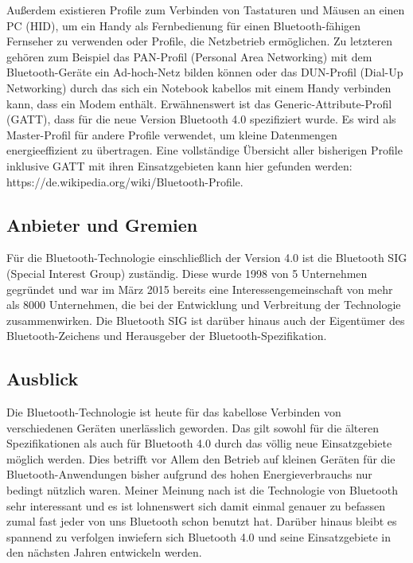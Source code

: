 \begin{multicols}{3}
Außerdem existieren Profile zum Verbinden von Tastaturen und Mäusen an einen PC (HID), um ein Handy als Fernbedienung für einen Bluetooth-fähigen Fernseher zu verwenden oder Profile, die Netzbetrieb ermöglichen. Zu letzteren gehören zum Beispiel das PAN-Profil (Personal Area Networking) mit dem Bluetooth-Geräte ein Ad-hoch-Netz bilden können oder das DUN-Profil (Dial-Up Networking) durch das sich ein Notebook kabellos mit einem Handy verbinden kann, dass ein Modem enthält. Erwähnenswert ist das Generic-Attribute-Profil (GATT), dass für die neue Version Bluetooth 4.0 spezifiziert wurde. Es wird als Master-Profil für andere Profile verwendet, um kleine Datenmengen energieeffizient zu übertragen. \cite{Bluetooth_4.2} Eine vollständige Übersicht aller bisherigen Profile inklusive GATT mit ihren Einsatzgebieten kann hier gefunden werden: https://de.wikipedia.org/wiki/Bluetooth-Profile.

\subsection*{Anbieter und Gremien}
Für die Bluetooth-Technologie einschließlich der Version 4.0 ist die Bluetooth SIG (Special Interest Group) zuständig. Diese wurde 1998 von 5 Unternehmen gegründet und war im März 2015 bereits eine Interessengemeinschaft von mehr als 8000 Unternehmen, die bei der Entwicklung und Verbreitung der Technologie zusammenwirken. Die Bluetooth SIG ist darüber hinaus auch der Eigentümer des Bluetooth-Zeichens und Herausgeber der Bluetooth-Spezifikation.\cite{Bluetooth_4.4}

\subsection*{Ausblick}
Die Bluetooth-Technologie ist heute für das kabellose 
Verbinden von verschiedenen Geräten unerlässlich geworden. 
Das gilt sowohl für die älteren Spezifikationen als auch für 
Bluetooth 4.0 durch das völlig neue Einsatzgebiete möglich werden. 
Dies betrifft vor Allem den Betrieb auf kleinen Geräten für die 
Bluetooth-Anwendungen bisher aufgrund des hohen Energieverbrauchs
nur bedingt nützlich waren. Meiner Meinung nach ist die Technologie
von Bluetooth sehr interessant und es ist lohnenswert sich damit einmal
genauer zu befassen zumal fast jeder von uns Bluetooth schon benutzt hat. 
Darüber hinaus bleibt es spannend zu verfolgen inwiefern sich Bluetooth 4.0 
und seine Einsatzgebiete in den nächsten Jahren entwickeln werden.
\printbibliography[segment=7,heading=subbibliography]
\end{multicols}

\newpage